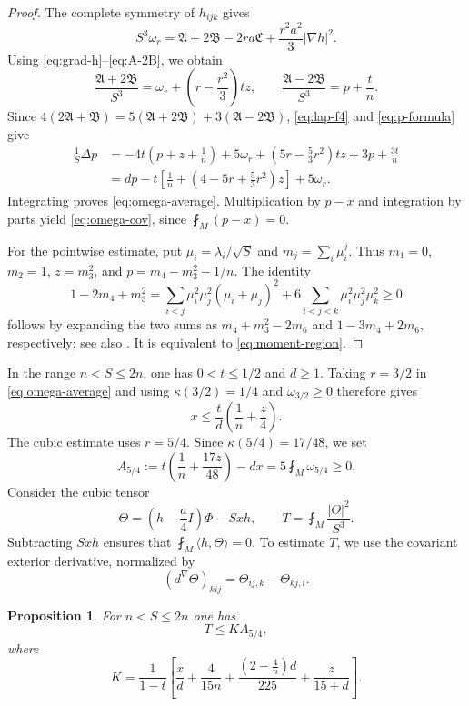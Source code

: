\documentclass[11pt,reqno]{amsart}
\numberwithin{equation}{section}
\newtheorem{proposition}[theorem]{Proposition}
\newcommand{\ip}[2]{\langle #1,#2\rangle}
\newcommand{\norm}[1]{\lvert #1\rvert}
\begin{document}
\begin{proof}
The complete symmetry of $h_{ijk}$ gives
\[
S^3\omega_r
=\mathfrak A+2\mathfrak B-2ra\mathfrak C
+\frac{r^2a^2}{3}\norm{\nabla h}^2.
\]
Using \eqref{eq:grad-h}--\eqref{eq:A-2B}, we obtain
\[
\frac{\mathfrak A+2\mathfrak B}{S^3}
=\omega_r+\left(r-\frac{r^2}{3}\right)tz,
\qquad
\frac{\mathfrak A-2\mathfrak B}{S^3}=p+\frac tn.
\]
Since $4(2\mathfrak A+\mathfrak B)=5(\mathfrak A+2\mathfrak B)+3(\mathfrak A-2\mathfrak B)$,
\eqref{eq:lap-f4} and \eqref{eq:p-formula} give
\begin{align*}
\frac1S\Delta p
&=-4t\left(p+z+\frac1n\right)
 +5\omega_r+\left(5r-\frac53r^2\right)tz+3p+\frac{3t}{n}\\
&=dp-t\left[\frac1n+\left(4-5r+\frac53r^2\right)z\right]+5\omega_r.
\end{align*}
Integrating proves \eqref{eq:omega-average}. Multiplication by $p-x$ and integration by parts yield \eqref{eq:omega-cov}, since $\fint_M(p-x)=0$.

For the pointwise estimate, put $\mu_i=\lambda_i/\sqrt S$ and
$m_j=\sum_i\mu_i^j$. Thus $m_1=0$, $m_2=1$, $z=m_3^2$, and
$p=m_4-m_3^2-1/n$. The identity
\[
1-2m_4+m_3^2
=\sum_{i<j}\mu_i^2\mu_j^2(\mu_i+\mu_j)^2
+6\sum_{i<j<k}\mu_i^2\mu_j^2\mu_k^2\ge0
\]
follows by expanding the two sums as $m_4+m_3^2-2m_6$ and $1-3m_4+2m_6$, respectively; see also \cite[Lemma~2.3]{Chen2026}. It is equivalent to \eqref{eq:moment-region}.
\end{proof}
In the range $n<S\le2n$, one has $0<t\le1/2$ and $d\ge1$. Taking $r=3/2$ in \eqref{eq:omega-average} and using $\kappa(3/2)=1/4$ and $\omega_{3/2}\ge0$ therefore gives
\begin{equation}\label{eq:scalar-admissible}
x\le\frac td\left(\frac1n+\frac z4\right).
\end{equation}
The cubic estimate uses $r=5/4$. Since $\kappa(5/4)=17/48$, we set
\begin{equation}\label{eq:A54}
A_{5/4}:=
 t\left(\frac1n+\frac{17z}{48}\right)-dx
=5\fint_M\omega_{5/4}\ge0.
\end{equation}
Consider the cubic tensor
\[
\Theta=\left(h-\frac a4I\right)\Phi-Sxh,
\qquad T=\fint_M\frac{\norm\Theta^2}{S^3}.
\]
Subtracting $Sxh$ ensures that $\fint_M\ip h\Theta=0$. To estimate $T$, we use the covariant exterior derivative, normalized by
\begin{equation}\label{eq:dnabla}
(d^\nabla\Theta)_{kij}=\Theta_{ij,k}-\Theta_{kj,i}.
\end{equation}

\begin{proposition}\label{prop:cubic}
For $n<S\le2n$ one has
\begin{equation}\label{eq:T-bound}
T\le K A_{5/4},
\end{equation}
where
\begin{equation}\label{eq:Kdef}
K=
\frac1{1-t}
\left[
\frac xd+\frac4{15n}
+\frac{(2-\frac4n)d}{225}
+\frac z{15+d}
\right].
\end{equation}
\end{proposition}
\end{document}
